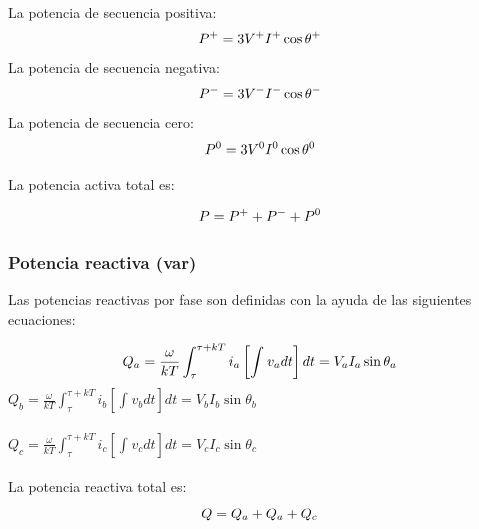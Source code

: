 La potencia de secuencia positiva:\\


\begin{equation}\label{EQ44}
P^+=3V^{+}I^{+}\cos\theta^{+}\\
\end{equation} 
La potencia de secuencia negativa:\\


\begin{equation}\label{EQ45}
P^-=3V^{-}I^{-}\cos\theta^{-}\\
\end{equation} 
La potencia de secuencia cero:\\


\begin{equation}\label{EQ46}
P^0=3V^{0}I^{0}\cos\theta^{0}\\
\end{equation} 

La potencia activa total es:

\begin{equation}\label{EQ47}
P=P^{+}+P^{-}+P^{0}\\
\end{equation}

\subsubsection{Potencia reactiva (var)}

Las potencias reactivas por fase son definidas con la ayuda de las siguientes ecuaciones:

\begin{equation}\label{EQ48}
Q_{a}=\frac{\omega}{kT}\int_{\tau}^{\tau +kT}i_{a}\left[\int_{}^{}v_{a}dt\right]dt=V_{a}I_{a}\sin\theta_{a}\\
\end{equation}
$Q_{b}=\frac{\omega}{kT}\int_{\tau}^{\tau +kT}i_{b}\left[\int_{}^{}v_{b}dt\right]dt=V_{b}I_{b}\sin\theta_{b}$\\\\

$Q_{c}=\frac{\omega}{kT}\int_{\tau}^{\tau +kT}i_{c}\left[\int_{}^{}v_{c}dt\right]dt=V_{c}I_{c}\sin\theta_{c}$\\\\

La potencia reactiva total es:\\

\begin{equation}\label{EQ50}
Q=Q_{a}+Q_{a}+Q_{c}\\
\end{equation}

